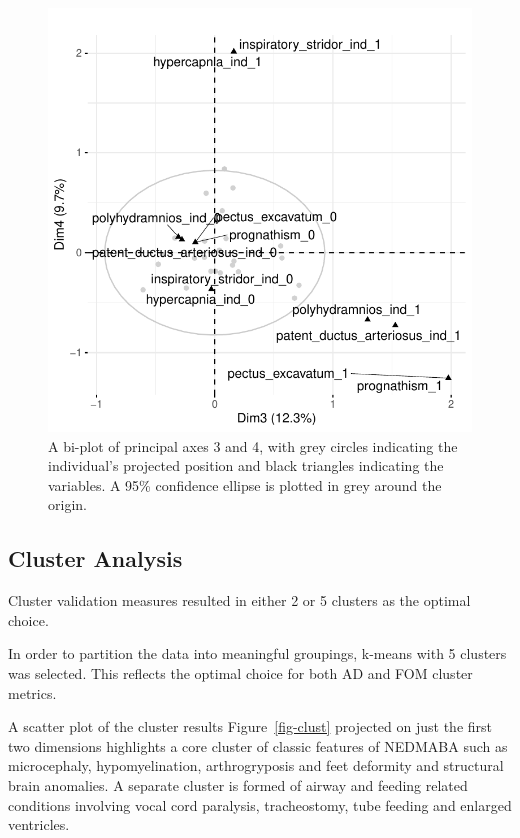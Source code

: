 \documentclass[
  authoryear,
  preprint,
  3p]{elsarticle}
\begin{document}
\begin{figure}

{\centering \includegraphics{paper_files/figure-pdf/fig-biplot2-1.pdf}

}

\caption{\label{fig-biplot2}A bi-plot of principal axes 3 and 4, with
grey circles indicating the individual's projected position and black
triangles indicating the variables. A 95\% confidence ellipse is plotted
in grey around the origin.}

\end{figure}

\hypertarget{cluster-analysis-1}{%
\subsection{Cluster Analysis}\label{cluster-analysis-1}}

Cluster validation measures resulted in either 2 or 5 clusters as the
optimal choice.

In order to partition the data into meaningful groupings, k-means with 5
clusters was selected. This reflects the optimal choice for both AD and
FOM cluster metrics.

A scatter plot of the cluster results Figure~\ref{fig-clust} projected
on just the first two dimensions highlights a core cluster of classic
features of NEDMABA such as microcephaly, hypomyelination,
arthrogryposis and feet deformity and structural brain anomalies. A
separate cluster is formed of airway and feeding related conditions
involving vocal cord paralysis, tracheostomy, tube feeding and enlarged
ventricles.
\end{document}
